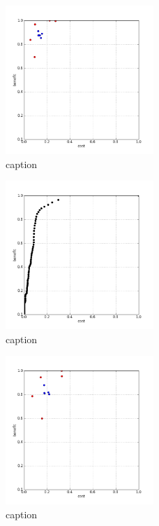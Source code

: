 %
\begin{figure}[!ht]
	\centering
	\includegraphics[width=0.5\textwidth]{img/p1figs/computeFrameStateMagnitudeOnly_sectionCompareBetter_smooth0_tol48.png}
	\caption{caption}
\end{figure}
%
\begin{figure}[!ht]
	\centering
	\includegraphics[width=0.5\textwidth]{img/p1figs/computeFrameStateMagnitudeOnly_sectionCompareBetter_smooth0_tol48_AUC.png}
	\caption{caption}
\end{figure}
%
\begin{figure}[!ht]
	\centering
	\includegraphics[width=0.5\textwidth]{img/p1figs/computeFrameStateMagnitudeOnly_sectionCompareBetter_smooth12_tol24.png}
	\caption{caption}
\end{figure}
